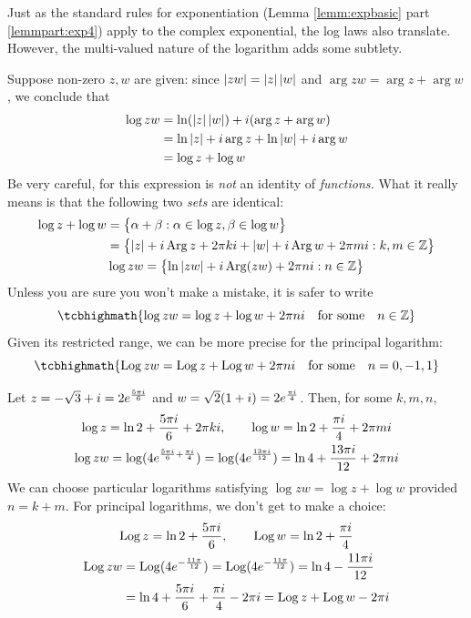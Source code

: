 Just as the standard rules for exponentiation (Lemma \ref*{lemm:expbasic} part \ref{lemmpart:exp4}) apply to the complex exponential, the log laws also translate. However, the multi-valued nature of the logarithm adds some subtlety.\smallbreak

Suppose non-zero $z,w$ are given: since $\left| zw\right|=\left| z\right|\left| w\right|$ and $\arg zw=\arg z+\arg w$, we conclude that
\begin{align*}
	\log zw&=\ln(\left| z\right|\left| w\right|)+i(\arg z+\arg w)\\
	&=\ln\left| z\right|+i\arg z+\ln\left| w\right|+i\arg w\\
	&=\log z+\log w
\end{align*}
Be very careful, for this expression is \emph{not} an identity of \emph{functions.} What it really means is that the following two \emph{sets} are identical:
\begin{gather*}
	\begin{aligned}
		\log z+\log w&=\bigl\{\alpha+\beta:\alpha\in\log z,\beta\in\log w\bigr\}\\
		&=\bigl\{\left| z\right|+i\operatorname{Arg} z+2\pi ki+\left| w\right|+i\operatorname{Arg} w+2\pi mi:k,m\in\mathbb{Z}\bigr\}
		\end{aligned}\\
	\log zw=\bigl\{\ln\left| zw\right|+i\operatorname{Arg}(zw)+2\pi ni:n\in\mathbb{Z}\bigr\} 
\end{gather*}
Unless you are sure you won't make a mistake, it is safer to write
\[
	\tcbhighmath{\log zw=\log z+\log w+2\pi ni\quad\text{for some}\quad n\in\Z}
\]
Given its restricted range, we can be more precise for the principal logarithm:
\[
	\tcbhighmath{\Log zw=\Log z+\Log w+2\pi ni\quad\text{for some}\quad n=0,-1,1}
\]


\begin{example}{}{}
	Let $z=-\sqrt 3+i=2e^{\frac{5\pi i}{6}}$ and $w=\sqrt 2(1+i)=2e^{\frac{\pi i}{4}}$. Then, for some $k,m,n$,
  \begin{gather*}
  	\log z=\ln 2+\frac{5\pi i}6 +2\pi ki,\qquad \log w=\ln 2+\frac{\pi i}4+2\pi mi\\
  	\log zw=\log(4e^{\frac{5\pi i}6+\frac{\pi i}4})=\log(4e^{\frac{13\pi i}{12}}) =\ln 4+\frac{13\pi i}{12}+2\pi ni
  \end{gather*}
  We can choose particular logarithms satisfying $\log zw=\log z+\log w$ provided $n=k+m$. For principal logarithms, we don't get to make a choice:
  \begin{gather*}
  	\operatorname{Log} z=\ln 2+\frac{5\pi i}6,\qquad \operatorname{Log} w=\ln 2+\frac{\pi i}4\\
  	\begin{aligned}
  		\operatorname{Log} zw&=\operatorname{Log}(4e^{-\frac{11\pi}{12}}) =\operatorname{Log}(4e^{-\frac{11\pi}{12}}) =\ln 4-\frac{11\pi i}{12}\\
  		&  = \ln 4+ \frac{5\pi i}6+\frac{\pi i}4 -2\pi i
  		=\operatorname{Log} z+\operatorname{Log} w-2\pi i
  	\end{aligned}
  \end{gather*}
\end{example}

